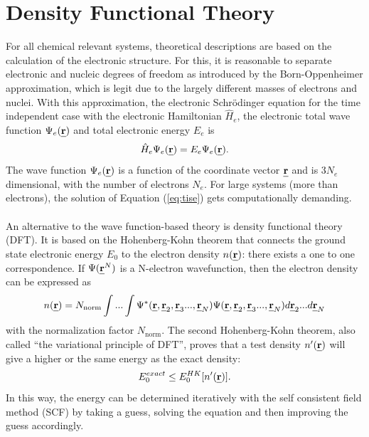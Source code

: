 \documentclass[11pt,DIV=13,BCOR=5mm,a4paper,headinclude]{scrbook}
\def\mathbi#1{\textbf{\em #1}}
\renewcommand{\vec}[1]{\mathbi{#1}}
\begin{document}
\section{Density Functional Theory}
For all chemical relevant systems, theoretical descriptions are based on the calculation of the electronic structure.
For this, it is reasonable to separate electronic and nucleic degrees of freedom as introduced by the Born-Oppenheimer approximation\cite{bornoppenheimer}, which is legit due to the largely different masses of electrons and nuclei.
With this approximation, the electronic Schrödinger equation for the time independent case  with the electronic Hamiltonian $\hat{H}_e$, the electronic total wave function $\Psi_e(\vec{r})$ and total electronic energy $E_e$ is
\begin{equation}\label{eq:tise}
 \hat{H}_e\Psi_e(\vec{r})=E_e\Psi_e(\vec{r}).
\end{equation}
The wave function $\Psi_e(\vec{r})$ is a function of the coordinate vector $\vec{r}$ and is 3$N_e$ dimensional, with the number of electrons $N_e$.
For large systems (more than electrons), the solution of Equation (\ref{eq:tise}) gets computationally demanding.
\\\\
An alternative to the wave function-based theory is density functional theory (DFT).
It is based on the Hohenberg-Kohn theorem\cite{Hohenberg-Kohn1964} that connects the ground state electronic energy $E_0$ to the electron density $n(\vec{r})$: there exists a one to one correspondence.
If $\Psi(\vec{r}^N)$ is a N-electron wavefunction, then the  electron density can be expressed as
\begin{equation}\label{eq:electron-density}
 n(\vec{r})=N_\textrm{norm}\int ...
\int \Psi^\ast(\vec{r},\vec{r}_2,\vec{r}_3...,\vec{r}_N)\Psi(\vec{r},\vec{r}_2,\vec{r}_3...,\vec{r}_N) d \vec{r}_2...d \vec{r}_N
\end{equation}
with the normalization factor $N_\textrm{norm}$.
The second Hohenberg-Kohn theorem, also called ``the variational principle of DFT'', proves that a test density $n^\prime(\vec{r})$ will give a higher or the same energy as the exact density:
\begin{equation}
 E_0^{exact}\leq E_0^{HK}[n^\prime(\vec{r})].
\end{equation}
In this way, the energy can be determined iteratively with the self consistent field method (SCF) by taking a guess, solving the equation and then improving the guess accordingly.
\end{document}
